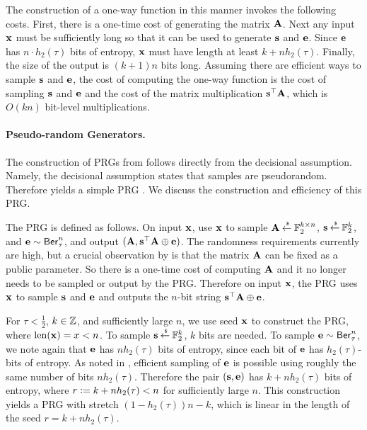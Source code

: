 The construction of a one-way function in this manner invokes the following costs.
First, there is a one-time cost of generating the matrix ${\mathbf A}$.
Next any input ${\mathbf x}$ must be sufficiently long so that it can be used to generate ${\mathbf s}$ and ${\mathbf e}$.
Since ${\mathbf e}$ has $n\cdot h_2(\tau)$ bits of entropy, ${\mathbf x}$ must have length at least $k + nh_2(\tau)$.
Finally, the size of the output is $(k+1)n$ bits long.
Assuming there are efficient ways to sample ${\mathbf s}$ and ${\mathbf e}$, the cost of computing the one-way function is the cost of sampling ${\mathbf s}$ and ${\mathbf e}$ and the cost of the matrix multiplication ${\mathbf s}^\top{\mathbf A}$, which is $O(kn)$ bit-level multiplications.



\paragraph{Pseudo-random Generators.} The construction of PRGs from \LPN follows directly from the decisional \LPN assumption.
Namely, the decisional \LPN assumption states that \LPN samples are pseudorandom.
Therefore \LPN yields a simple PRG \cite{C:BFKL93}.
We discuss the construction and efficiency of this PRG.

The PRG is defined as follows. 
On input ${\mathbf x}$, use ${\mathbf x}$ to sample ${\mathbf A} \mathbin{\stackrel{\mbox{\,\tiny \$}}{\gets}} {\mathbb F}_2^{k\times n}$, ${\mathbf s} \mathbin{\stackrel{\mbox{\,\tiny \$}}{\gets}} {\mathbb F}_2^k$, and ${\mathbf e} \sim \mathsf{Ber}_\tau^n$, and output $({\mathbf A}, {\mathbf s}^\top{\mathbf A}\oplus{\mathbf e})$.
The randomness requirements currently are high, but a crucial observation by \cite{C:ACPS09} is that the matrix ${\mathbf A}$ can be fixed as a public parameter.
So there is a one-time cost of computing ${\mathbf A}$ and it no longer needs to be sampled or output by the PRG.
Therefore on input ${\mathbf x}$, the PRG uses ${\mathbf x}$ to sample ${\mathbf s}$ and ${\mathbf e}$ and outputs the $n$-bit string ${\mathbf s}^\top{\mathbf A}\oplus{\mathbf e}$.

For $\tau < \frac{1}{2}$, $k \in {\mathbb Z}$, and sufficiently large $n$, we use seed ${\mathbf x}$ to construct the PRG, where $\mathrm{len}({\mathbf x}) = x < n$.
To sample ${\mathbf s} \mathbin{\stackrel{\mbox{\,\tiny \$}}{\gets}} {\mathbb F}_2^k$, $k$ bits are needed.
To sample ${\mathbf e}\sim\mathsf{Ber}_\tau^n$, we note again that ${\mathbf e}$ has $nh_2(\tau)$ bits of entropy, since each bit of ${\mathbf e}$ has $h_2(\tau)$-bits of entropy.
As noted in \cite{C:ACPS09}, efficient sampling of ${\mathbf e}$ is possible using roughly the same number of bits $nh_2(\tau)$.
Therefore the pair $({\mathbf s},{\mathbf e})$ has $k+nh_2(\tau)$ bits of entropy, where $r{\;\vcentcolon=\;} k+nh_2(\tau) < n$ for sufficiently large $n$.
This construction yields a PRG with stretch $(1 - h_2(\tau))n-k$, which is linear in the length of the seed $r = k+nh_2(\tau)$.

